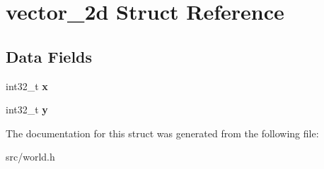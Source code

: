 \hypertarget{structvector__2d}{}\section{vector\+\_\+2d Struct Reference}
\label{structvector__2d}
\subsection*{Data Fields}
\begin{DoxyCompactItemize}
\item 
\hypertarget{structvector__2d_ae5239b02f8e25952a8a676f1116619f0}{}int32\+\_\+t {\bfseries x}\label{structvector__2d_ae5239b02f8e25952a8a676f1116619f0}

\item 
\hypertarget{structvector__2d_a26801dd44dc219a8d4856d3bc199863e}{}int32\+\_\+t {\bfseries y}\label{structvector__2d_a26801dd44dc219a8d4856d3bc199863e}

\end{DoxyCompactItemize}


The documentation for this struct was generated from the following file\+:\begin{DoxyCompactItemize}
\item 
src/world.\+h\end{DoxyCompactItemize}

